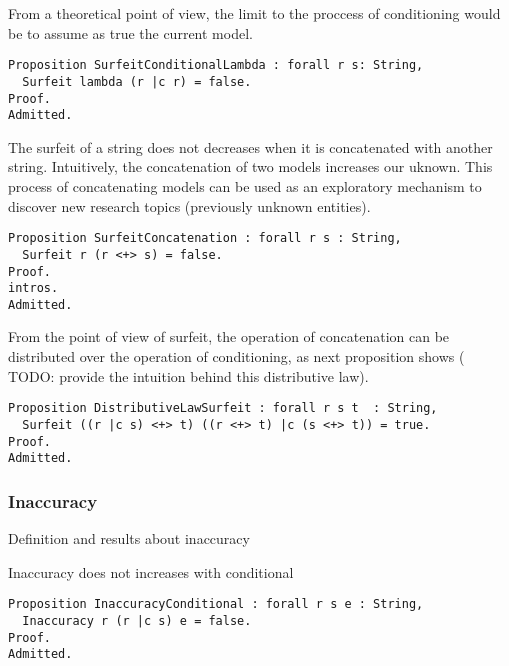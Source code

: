 From a theoretical point of view, the limit to the proccess of conditioning would be to assume as true the current model.

\begin{sourcecode}
{\scriptsize \begin{verbatim}
Proposition SurfeitConditionalLambda : forall r s: String, 
  Surfeit lambda (r |c r) = false.
Proof.
Admitted.
\end{verbatim}}
\end{sourcecode}

The surfeit of a string does not decreases when it is concatenated with another string. Intuitively, the concatenation of two models increases our uknown. This process of concatenating models can be used as an exploratory mechanism to discover new research topics (previously unknown entities).

\begin{sourcecode}
{\scriptsize \begin{verbatim}
Proposition SurfeitConcatenation : forall r s : String, 
  Surfeit r (r <+> s) = false.
Proof.
intros.
Admitted.
\end{verbatim}}
\end{sourcecode}

From the point of view of surfeit, the operation of concatenation can be distributed over the operation of conditioning, as next proposition shows ({\color{red} TODO: provide the intuition behind this distributive law}).

\begin{sourcecode}
{\scriptsize \begin{verbatim}
Proposition DistributiveLawSurfeit : forall r s t  : String,
  Surfeit ((r |c s) <+> t) ((r <+> t) |c (s <+> t)) = true.
Proof.
Admitted.
\end{verbatim}}
\end{sourcecode}


\subsubsection*{Inaccuracy}

{\color{red} Definition and results about inaccuracy}

{\color{red} Inaccuracy does not increases with conditional}

\begin{sourcecode}
{\scriptsize \begin{verbatim}
Proposition InaccuracyConditional : forall r s e : String, 
  Inaccuracy r (r |c s) e = false.
Proof.
Admitted.
\end{verbatim}}
\end{sourcecode}

